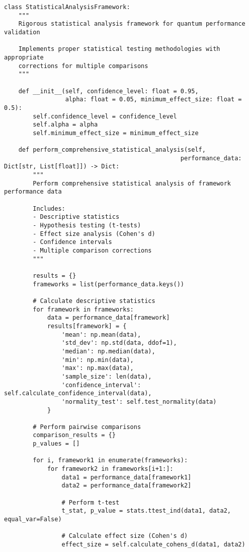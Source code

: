 \documentclass[12pt,a4paper]{report}
\begin{document}
\begin{lstlisting}
class StatisticalAnalysisFramework:
    """
    Rigorous statistical analysis framework for quantum performance validation

    Implements proper statistical testing methodologies with appropriate
    corrections for multiple comparisons
    """

    def __init__(self, confidence_level: float = 0.95,
                 alpha: float = 0.05, minimum_effect_size: float = 0.5):
        self.confidence_level = confidence_level
        self.alpha = alpha
        self.minimum_effect_size = minimum_effect_size

    def perform_comprehensive_statistical_analysis(self,
                                                 performance_data: Dict[str, List[float]]) -> Dict:
        """
        Perform comprehensive statistical analysis of framework performance data

        Includes:
        - Descriptive statistics
        - Hypothesis testing (t-tests)
        - Effect size analysis (Cohen's d)
        - Confidence intervals
        - Multiple comparison corrections
        """

        results = {}
        frameworks = list(performance_data.keys())

        # Calculate descriptive statistics
        for framework in frameworks:
            data = performance_data[framework]
            results[framework] = {
                'mean': np.mean(data),
                'std_dev': np.std(data, ddof=1),
                'median': np.median(data),
                'min': np.min(data),
                'max': np.max(data),
                'sample_size': len(data),
                'confidence_interval': self.calculate_confidence_interval(data),
                'normality_test': self.test_normality(data)
            }

        # Perform pairwise comparisons
        comparison_results = {}
        p_values = []

        for i, framework1 in enumerate(frameworks):
            for framework2 in frameworks[i+1:]:
                data1 = performance_data[framework1]
                data2 = performance_data[framework2]

                # Perform t-test
                t_stat, p_value = stats.ttest_ind(data1, data2, equal_var=False)

                # Calculate effect size (Cohen's d)
                effect_size = self.calculate_cohens_d(data1, data2)


\end{lstlisting}
\end{document}
